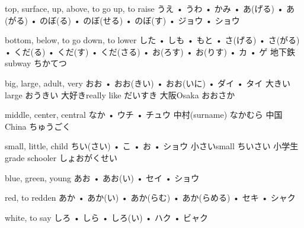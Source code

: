 



\setcounter{cardnum}{57}

		{top, surface, up, above, to go up, to raise}
		{うえ • うわ • かみ • あ(げる) • あ(がる) • のぼ(る) • のぼ(せる) • のぼ(す) • ジョウ • ショウ}
		{}{}
		{}{}
		{}{}
		{}{}
		{}{}

		{bottom, below, to go down, to lower}
		{した • しも • もと • さ(げる) • さ(がる) • くだ(る) • くだ(す) • くだ(さる) • お(ろす) • お(りす) • カ • ゲ}
		{地下鉄}{subway ちかてつ}
		{}{}
		{}{}
		{}{}
		{}{}

		{big, large, adult, very}
		{おお • おお(きい) • おお(いに) • ダイ • タイ}
		{大きい}{large おうきい}
		{大好き}{really like だいすき}
		{大阪}{Osaka おおさか}
		{}{}
		{}{}

		{middle, center, central}
		{なか • ウチ • チュウ}
		{中村}{(surname) なかむら}
		{中国}{China ちゅうごく}
		{}{}
		{}{}
		{}{}

		{small, little, child}
		{ちい(さい) • こ • お • ショウ}
		{小さい}{small ちいさい}
		{小学生}{grade schooler しょおがくせい}
		{}{}
		{}{}
		{}{}

		{blue, green, young}
		{あお • あお(い) • セイ • ショウ}
		{}{}
		{}{}
		{}{}
		{}{}
		{}{}

		{red, to redden}
		{あか • あか(い) • あか(らむ) • あか(らめる) • セキ • シャク}
		{}{}
		{}{}
		{}{}
		{}{}
		{}{}

		{white, to say}
		{しろ • しら • しろ(い) • ハク • ビャク}
		{}{}
		{}{}
		{}{}
		{}{}
		{}{}

